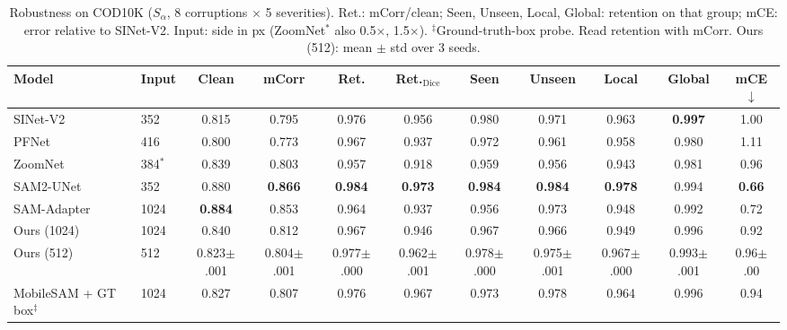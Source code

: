 \begin{table}[t]
\centering
\caption{Robustness on COD10K ($S_\alpha$, 8 corruptions $\times$ 5 severities). Ret.: mCorr/clean; Seen, Unseen, Local, Global: retention on that group; mCE: error relative to SINet-V2. Input: side in px (ZoomNet$^*$ also 0.5$\times$, 1.5$\times$). $^\ddagger$Ground-truth-box probe. Read retention with mCorr. Ours (512): mean $\pm$ std over 3 seeds.}
\label{tab:robust}
\footnotesize
\setlength{\tabcolsep}{4pt}
\begin{tabular}{llccccccccc}
\toprule
Model & Input & Clean & mCorr & Ret. & Ret.$_{\mathrm{Dice}}$ & Seen & Unseen & Local & Global & mCE$\downarrow$ \\
\midrule
SINet-V2 & 352 & 0.815 & 0.795 & 0.976 & 0.956 & 0.980 & 0.971 & 0.963 & \textbf{0.997} & 1.00 \\
PFNet & 416 & 0.800 & 0.773 & 0.967 & 0.937 & 0.972 & 0.961 & 0.958 & 0.980 & 1.11 \\
ZoomNet & 384$^*$ & 0.839 & 0.803 & 0.957 & 0.918 & 0.959 & 0.956 & 0.943 & 0.981 & 0.96 \\
\midrule
SAM2-UNet & 352 & 0.880 & \textbf{0.866} & \textbf{0.984} & \textbf{0.973} & \textbf{0.984} & \textbf{0.984} & \textbf{0.978} & 0.994 & \textbf{0.66} \\
SAM-Adapter & 1024 & \textbf{0.884} & 0.853 & 0.964 & 0.937 & 0.956 & 0.973 & 0.948 & 0.992 & 0.72 \\
\midrule
Ours (1024) & 1024 & 0.840 & 0.812 & 0.967 & 0.946 & 0.967 & 0.966 & 0.949 & 0.996 & 0.92 \\
Ours (512) & 512 & 0.823{\tiny$\pm$.001} & 0.804{\tiny$\pm$.001} & 0.977{\tiny$\pm$.000} & 0.962{\tiny$\pm$.001} & 0.978{\tiny$\pm$.000} & 0.975{\tiny$\pm$.001} & 0.967{\tiny$\pm$.000} & 0.993{\tiny$\pm$.001} & 0.96{\tiny$\pm$.00} \\
\midrule
MobileSAM + GT box$^\ddagger$ & 1024 & 0.827 & 0.807 & 0.976 & 0.967 & 0.973 & 0.978 & 0.964 & 0.996 & 0.94 \\
\bottomrule
\end{tabular}
\end{table}
